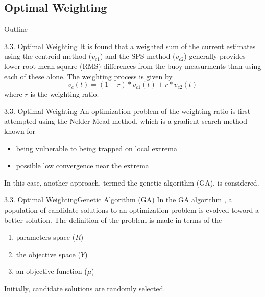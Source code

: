 \documentclass[12pt]{beamer}
\begin{document}
\subsection{Optimal Weighting}
\begin{frame}{Outline}
  \transfade%
  \tableofcontents[sectionstyle=show/shaded,subsectionstyle=show/shaded] %
\end{frame}
\begin{frame}{3.3. Optimal Weighting}
  It is found that a weighted sum of the current estimates using the centroid method ($v_{c1}$) and the SPS method ($v_{c2}$) generally provides lower root mean square (RMS) differences from the buoy measurments than using each of these alone. The weighting process is given by\begin{equation}
    v_c(t)=(1-r)*v_{c1}(t)+r*v_{c2}(t)
  \end{equation}
  where $r$ is the weighting ratio. 
\end{frame}
\begin{frame}{3.3. Optimal Weighting}
  An optimization problem of the weighting ratio is first attempted using the Nelder-Mead method, which is a gradient search method known for \begin{itemize}\pause
    \item being vulnerable to being {\color{magenta} trapped on local extrema}
    \item possible {\color{magenta} low convergence near the extrema}
  \end{itemize}\pause
   In this case, another approach, termed the genetic algorithm (GA), is considered.
\end{frame}

\begin{frame}{3.3. Optimal Weighting}{Genetic Algorithm (GA)}
  In the GA algorithm , a population of candidate solutions to an optimization problem is evolved toword a better solution. The definition of the problem is made in terms of the 
  \begin{enumerate}
    \item parameters space ($R$)
    \item the objective space ($Y$)
    \item an objective function ($\mu$)
  \end{enumerate}
  Initially, candidate solutions are randomly selected.
\end{frame}
\end{document}
